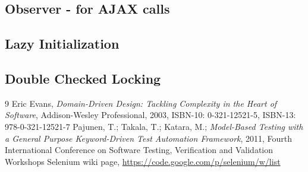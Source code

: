 \documentclass[12pt,twoside]{article}
\begin{document}
\subsection{Observer - for AJAX calls}
\subsection{Lazy Initialization}
\subsection{Double Checked Locking}




\begin{thebibliography} {9}
 Eric Evans, {\sl Domain-Driven Design: Tackling Complexity in the Heart of Software}, Addison-Wesley Professional, 2003, ISBN-10: 0-321-12521-5, ISBN-13: 978-0-321-12521-7
 Pajunen, T.; Takala, T.; Katara, M.; {\sl Model-Based Testing with a General Purpose Keyword-Driven Test Automation Framework}, 2011, Fourth International Conference on Software Testing, Verification and Validation Workshops
 Selenium wiki page, \url{https://code.google.com/p/selenium/w/list}
\end{thebibliography}
\end{document}
